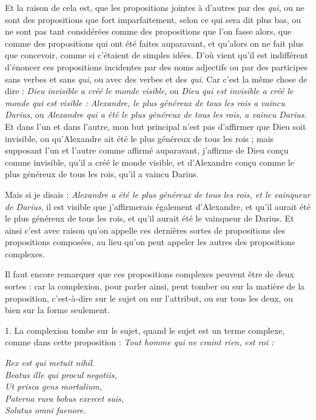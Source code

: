 Et la raison de cela est, que les propositions jointes à d'autres par des \emph{qui}, ou ne sont des propositions que fort imparfaitement, selon ce qui sera dit plus bas, ou ne sont pas tant considérées comme des propositions que l'on fasse alors, que comme des propositions qui ont été faites auparavant, et qu'alors on ne fait plus que concevoir, comme si c'étaient de simples idées. D'où vient qu'il est indifférent d'énoncer ces propositions incidentes par des noms adjectifs ou par des participes sans verbes et sans \emph{qui}, ou avec des verbes et des \emph{qui}. Car c'est la même chose de dire : \emph{Dieu invisible a créé le monde visible}, ou \emph{Dieu qui est invisible a créé le monde qui est visible : Alexandre, le plus généreux de tous les rois a vaincu Darius}, ou \emph{Alexandre qui a été le plus généreux de tous les rois, a vaincu Darius}. Et dans l'un et dans l'autre, mon but principal n'est pas d'affirmer que Dieu soit invisible, ou qu'Alexandre ait été le plus généreux de tous les rois ; mais supposant l'un et l'autre comme affirmé auparavant, j'affirme de Dieu conçu comme invisible, qu'il a créé le monde visible, et d'Alexandre conçu comme le plus généreux de tous les rois, qu'il a vaincu Darius.

Mais si je disais : \emph{Alexandre a été le plus généreux de tous les rois, et le vainqueur de Darius}, il est visible que j'affirmerais également d'Alexandre, et qu'il aurait été le plus généreux de tous les rois, et qu'il aurait été le vainqueur de Darius. Et ainsi c'est avec raison qu'on appelle ces dernières sortes de propositions des propositions composées, au lieu qu'on peut appeler les autres des propositions complexes.

Il faut encore remarquer que ces propositions complexes peuvent être de deux sortes : car la complexion, pour parler ainsi, peut tomber ou sur la matière de la proposition, c'est-à-dire sur le sujet ou sur l'attribut, ou sur tous les deux, ou bien sur la forme seulement.

\bigbreak
{1.} La complexion tombe sur le sujet, quand le sujet est un terme complexe, comme dans cette proposition : \emph{Tout homme qui ne craint rien, est roi :}\begin{center}\emph{Rex est qui metuit nihil. \\ Beatus ille qui procul negotiis, \\ Ut prisca gens mortalium, \\ Paterna rura bobus exercet suis, \\ Solutus omni faenore}.\end{center}

